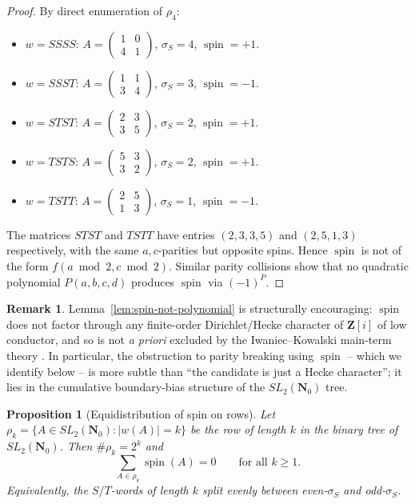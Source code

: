 \documentclass[11pt]{article}
\newtheorem{proposition}[theorem]{Proposition}
\theoremstyle{definition}
\newtheorem{remark}[theorem]{Remark}
\newcommand{\Nz}{\mathbf{N}_0}
\newcommand{\Z}{\mathbf{Z}}
\newcommand{\SLNz}{SL_2(\Nz)}
\DeclareMathOperator{\spin}{spin}
\begin{document}
\begin{proof}
By direct enumeration of $\rho_{4}$:
\begin{itemize}
\item $w=SSSS$: $A=\begin{pmatrix}1&0\\4&1\end{pmatrix}$, $\sigma_{S}=4$,
$\spin=+1$.
\item $w=SSST$: $A=\begin{pmatrix}1&1\\3&4\end{pmatrix}$, $\sigma_{S}=3$,
$\spin=-1$.
\item $w=STST$: $A=\begin{pmatrix}2&3\\3&5\end{pmatrix}$, $\sigma_{S}=2$,
$\spin=+1$.
\item $w=TSTS$: $A=\begin{pmatrix}5&3\\3&2\end{pmatrix}$, $\sigma_{S}=2$,
$\spin=+1$.
\item $w=TSTT$: $A=\begin{pmatrix}2&5\\1&3\end{pmatrix}$, $\sigma_{S}=1$,
$\spin=-1$.
\end{itemize}
The matrices $STST$ and $TSTT$ have entries
$(2,3,3,5)$ and $(2,5,1,3)$ respectively, with the same $a,c$-parities
but opposite spins. Hence $\spin$ is not of the form $f(a\bmod 2,
c\bmod 2)$. Similar parity collisions show that no quadratic polynomial
$P(a,b,c,d)$ produces $\spin$ via $(-1)^{P}$.
\end{proof}

\begin{remark}\label{rem:spin-good-news}
Lemma~\ref{lem:spin-not-polynomial} is structurally encouraging: $\spin$
does not factor through any finite-order Dirichlet/Hecke character of
$\Z[i]$ of low conductor, and so is not \emph{a priori} excluded by the
Iwaniec--Kowalski main-term theory \cite[\S 21]{IK04}. In particular,
the obstruction to parity breaking using $\spin$ -- which we identify
below -- is more subtle than ``the candidate is just a Hecke
character''; it lies in the cumulative boundary-bias structure of the
$\SLNz$ tree.
\end{remark}

\begin{proposition}[Equidistribution of spin on rows]
\label{prop:spin-equi-row}
Let $\rho_{k}=\{A\in\SLNz:|w(A)|=k\}$ be the row of length $k$ in the
binary tree of $\SLNz$. Then $\#\rho_{k}=2^{k}$ and
\[
\sum_{A\in\rho_{k}}\spin(A)=0\qquad\text{for all }k\ge 1.
\]
Equivalently, the $S/T$-words of length $k$ split evenly between
even-$\sigma_{S}$ and odd-$\sigma_{S}$.
\end{proposition}
\end{document}
